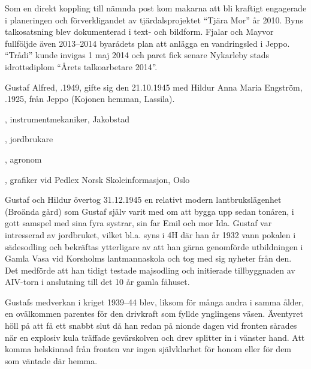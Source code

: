 Som en direkt koppling till nämnda post kom makarna att bli kraftigt engagerade i planeringen och förverkligandet av tjärdalsprojektet ``Tjära Mor'' år 2010. Byns talkosatsning blev dokumenterad i text- och bildform. Fjalar och Mayvor fullföljde även 2013--2014 byarådets plan att anlägga en vandringsled i Jeppo. ``Trådi'' kunde invigas 1 maj 2014 och paret fick senare Nykarleby stads idrottsdiplom ``Årets talkoarbetare 2014''.






Gustaf Alfred, .1949, gifte sig den 21.10.1945 med Hildur Anna Maria Engström, .1925, från Jeppo (Kojonen hemman, Lassila).
\begin{jhchildren}
  \item {}, instrumentmekaniker, Jakobstad
  \item {}, jordbrukare
  \item {}, agronom
  \item {}, grafiker vid Pedlex Norsk Skoleinformasjon, Oslo
\end{jhchildren}

Gustaf och Hildur övertog 31.12.1945 en relativt modern lantbrukslägenhet (Broända gård) som Gustaf själv varit med om att bygga upp sedan tonåren, i gott samspel med sina fyra systrar, sin far Emil och mor Ida. Gustaf var intresserad av jordbruket, vilket bl.a. syns i 4H där han år 1932 vann pokalen i sädesodling och bekräftas ytterligare av att han gärna genomförde utbildningen i Gamla Vasa vid 	Korsholms lantmannaskola och tog med sig nyheter från den. Det medförde att han tidigt testade majsodling och initierade tillbyggnaden av AIV-torn i anslutning till det 10 år gamla fähuset.

Gustafs medverkan i kriget 1939--44 blev, liksom för många andra i samma ålder, en ovälkommen parentes för den drivkraft som fyllde ynglingens väsen. Äventyret höll på att få ett snabbt slut då han redan på nionde dagen vid fronten sårades när en explosiv kula träffade gevärskolven och drev splitter in i vänster hand. Att komma helskinnad från fronten var ingen självklarhet för honom eller för dem som väntade där hemma.

